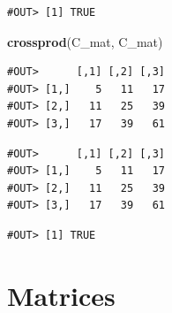\documentclass[]{book}
\newenvironment{Shaded}{\begin{snugshade}}{\end{snugshade}}
\newcommand{\KeywordTok}[1]{\textcolor[rgb]{0.13,0.29,0.53}{\textbf{#1}}}
\newcommand{\StringTok}[1]{\textcolor[rgb]{0.31,0.60,0.02}{#1}}
\newcommand{\OperatorTok}[1]{\textcolor[rgb]{0.81,0.36,0.00}{\textbf{#1}}}
\newcommand{\NormalTok}[1]{#1}
\theoremstyle{definition}
\theoremstyle{definition}
\theoremstyle{definition}
\theoremstyle{remark}
\begin{document}
\begin{Shaded}
\end{Shaded}

\begin{verbatim}
#OUT> [1] TRUE
\end{verbatim}

\begin{Shaded}
\begin{Highlighting}[]
\KeywordTok{crossprod}\NormalTok{(C_mat, C_mat)}
\end{Highlighting}
\end{Shaded}

\begin{verbatim}
#OUT>      [,1] [,2] [,3]
#OUT> [1,]    5   11   17
#OUT> [2,]   11   25   39
#OUT> [3,]   17   39   61
\end{verbatim}

\begin{Shaded}
\end{Shaded}

\begin{verbatim}
#OUT>      [,1] [,2] [,3]
#OUT> [1,]    5   11   17
#OUT> [2,]   11   25   39
#OUT> [3,]   17   39   61
\end{verbatim}

\begin{Shaded}
\end{Shaded}

\begin{verbatim}
#OUT> [1] TRUE
\end{verbatim}

\section{Matrices}\label{matrices-1}
\end{document}
